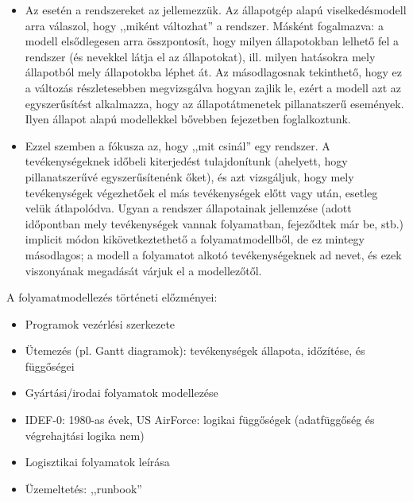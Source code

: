 \begin{itemize}
	\item Az  esetén a rendszereket az  jellemezzük. Az állapotgép alapú viselkedésmodell arra válaszol, hogy ,,miként változhat'' a rendszer. Másként fogalmazva: a modell elsődlegesen arra összpontosít, hogy milyen állapotokban lelhető fel a rendszer (és nevekkel látja el az állapotokat), ill. milyen hatásokra mely állapotból mely állapotokba léphet át. Az másodlagosnak tekinthető, hogy ez a változás részletesebben megvizsgálva hogyan zajlik le, ezért a modell azt az egyszerűsítést alkalmazza, hogy az állapotátmenetek pillanatszerű események. Ilyen állapot alapú modellekkel bővebben   fejezetben foglalkoztunk.
	\item Ezzel szemben a  fókusza az, hogy ,,mit csinál'' egy rendszer. A tevékenységeknek időbeli kiterjedést tulajdonítunk (ahelyett, hogy pillanatszerűvé egyszerűsítenénk őket), és azt vizsgáljuk, hogy mely tevékenységek végezhetőek el más tevékenységek előtt vagy után, esetleg velük átlapolódva. Ugyan a rendszer állapotainak jellemzése (adott időpontban mely tevékenységek vannak folyamatban, fejeződtek már be, stb.) implicit módon kikövetkeztethető a folyamatmodellből, de ez mintegy másodlagos; a modell a folyamatot alkotó tevékenységeknek ad nevet, és ezek viszonyának megadását várjuk el a modellezőtől.
\end{itemize}

\begin{megjegyzes}
A folyamatmodellezés történeti előzményei:

\begin{itemize}
	\item Programok vezérlési szerkezete
	\item Ütemezés (pl. Gantt diagramok): tevékenységek állapota, időzítése, és függőségei
	\item Gyártási/irodai folyamatok modellezése
	\item IDEF-0: 1980-as évek, US AirForce: logikai függőségek (adatfüggőség és végrehajtási logika nem)
	\item Logisztikai folyamatok leírása
	\item Üzemeltetés: ,,runbook''
\end{itemize}


\end{megjegyzes}


